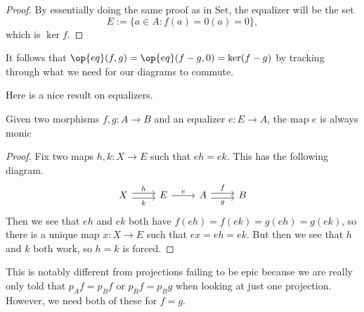 \begin{proof}
	By essentially doing the same proof as in $\mathrm{Set}$, the equalizer will be the set
	\[E:=\{a\in A:f(a)=0(a)=0\},\]
	which is $\ker f$.
\end{proof}
\begin{remark}
	It follows that $\op{eq}(f,g)=\op{eq}(f-g,0)=\ker(f-g)$ by tracking through what we need for our diagrams to commute.
\end{remark}
Here is a nice result on equalizers.
\begin{prop}
	Given two morphisms $f,g:A\to B$ and an equalizer $e:E\to A$, the map $e$ is always monic
\end{prop}
\begin{proof}
	Fix two maps $h,k:X\to E$ such that $eh=ek$. This has the following diagram.
	\[\begin{tikzcd}
		X & E & A & B
		\arrow["g"', shift right=1, from=1-3, to=1-4]
		\arrow["f", shift left=1, from=1-3, to=1-4]
		\arrow["e", from=1-2, to=1-3]
		\arrow["h", shift left=1, from=1-1, to=1-2]
		\arrow["k"', shift right=1, from=1-1, to=1-2]
	\end{tikzcd}\]
	Then we see that $eh$ and $ek$ both have $f(eh)=f(ek)=g(eh)=g(ek)$, so there is a unique map $x:X\to E$ such that $ex=eh=ek$. But then we see that $h$ and $k$ both work, so $h=k$ is forced.
\end{proof}
\begin{remark}
	This is notably different from projections failing to be epic because we are really only told that $p_Af=p_Bf$ or $p_Bf=p_Bg$ when looking at just one projection. However, we need both of these for $f=g$.
\end{remark}

